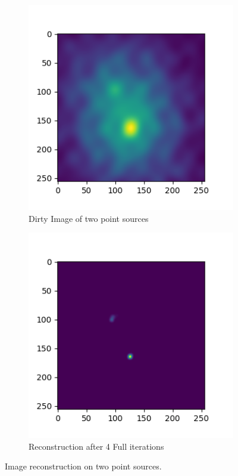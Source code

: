 \begin{figure}[h]
	\centering
	\begin{subfigure}[b]{0.45\linewidth}
		\includegraphics[width=\linewidth]{./chapters/05.algorithms/sim02/sim02_point_dirty.png}
		\caption{Dirty Image of two point sources}
		\label{results:point:dirty}
	\end{subfigure}
	\begin{subfigure}[b]{0.45\linewidth}
		\includegraphics[width=\linewidth]{./chapters/05.algorithms/sim02/image4.png}
		\caption{Reconstruction after 4 Full iterations}
		\label{results:point:cd}
	\end{subfigure}
	\caption{Image reconstruction on two point sources.}
	\label{results:point}
\end{figure}

